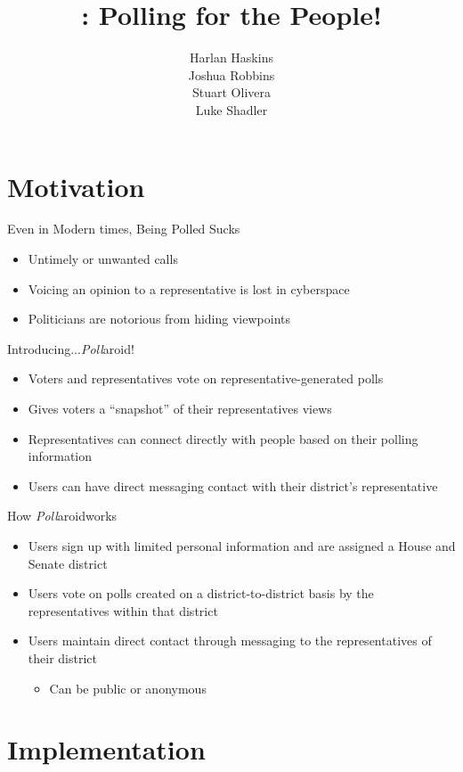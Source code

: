 \documentclass[11pt,aps,prb,groupedaddress,nofootinbib,floatfix]{beamer}
\author{Harlan Haskins\\Joshua Robbins\\Stuart Olivera\\Luke Shadler}
\title{\pollaroid : Polling for the People!}
\institute{Rochester Institute of Technology}
\newcommand{\pollaroid}{\emph{Poll}aroid}
\begin{document}
\begin{frame}
\titlepage
\end{frame}


\section{Motivation}
%
%
\begin{frame}{Even in Modern times, Being Polled Sucks}
\begin{itemize}
	\item Untimely or unwanted calls
	\item Voicing an opinion to a representative is lost in cyberspace
	\item Politicians are notorious from hiding viewpoints
\end{itemize}
\end{frame}

\begin{frame}{Introducing...\pollaroid!}
\begin{itemize}
	\item Voters and representatives vote on representative-generated polls
	\item Gives voters a ``snapshot'' of their representatives views
	\item Representatives can connect directly with people based on their polling information
	\item Users can have direct messaging contact with their district's representative
\end{itemize}
\end{frame}

\begin{frame}{How \pollaroid works}
\begin{itemize}
	\item Users sign up with limited personal information and are assigned a House and Senate district
	\item Users vote on polls created on a district-to-district basis by the representatives within that district
	\item Users maintain direct contact through messaging to the representatives of their district
	\begin{itemize}
		\item Can be public or anonymous
	\end{itemize}
\end{itemize}
\end{frame}

\section{Implementation}
\end{document}

